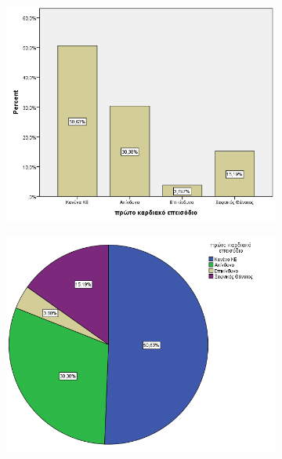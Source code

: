 \clearpage

\begin{figure}[hb]
 \centering
            \begin{subfigure}{0.7\textwidth}
     \centering
         \includegraphics[width=\textwidth]{images/5.png}
                      \end{subfigure}
                       
     \begin{subfigure}{0.6\textwidth}
     \centering
     \vspace{2cm}
         \includegraphics[width=\textwidth]{images/6.png}
                      \end{subfigure}
    \end{figure}

